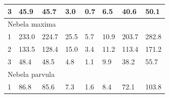 \documentclass[12pt, a4paper]{article}
\begin{document}
\begin{table}[h]
{\begin{tabular}{|llllllll|}
\multicolumn{1}{|l|}{3}                                         & \multicolumn{1}{l|}{45.9}                        & \multicolumn{1}{l|}{45.7}         & \multicolumn{1}{l|}{3.0}                         & \multicolumn{1}{l|}{0.7}                 & \multicolumn{1}{l|}{6.5}                      & \multicolumn{1}{l|}{40.6}         & 50.1                               \\ \hline
\multicolumn{8}{|l|}{Nebela maxima}                                                                                                                                                                                                                                                                                                                                           \\ \hline
\multicolumn{1}{|l|}{1}                                         & \multicolumn{1}{l|}{233.0}                       & \multicolumn{1}{l|}{224.7}        & \multicolumn{1}{l|}{25.5}                        & \multicolumn{1}{l|}{5.7}                 & \multicolumn{1}{l|}{10.9}                     & \multicolumn{1}{l|}{203.7}        & 282.8                              \\ \hline
\multicolumn{1}{|l|}{2}                                         & \multicolumn{1}{l|}{133.5}                       & \multicolumn{1}{l|}{128.4}        & \multicolumn{1}{l|}{15.0}                        & \multicolumn{1}{l|}{3.4}                 & \multicolumn{1}{l|}{11.2}                     & \multicolumn{1}{l|}{113.4}        & 171.2                              \\ \hline
\multicolumn{1}{|l|}{3}                                         & \multicolumn{1}{l|}{48.4}                        & \multicolumn{1}{l|}{48.5}         & \multicolumn{1}{l|}{4.8}                         & \multicolumn{1}{l|}{1.1}                 & \multicolumn{1}{l|}{9.9}                      & \multicolumn{1}{l|}{38.2}         & 55.7                               \\ \hline
\multicolumn{8}{|l|}{Nebela parvula}                                                                                                                                                                                                                                                                                                                                          \\ \hline
\multicolumn{1}{|l|}{1}                                         & \multicolumn{1}{l|}{86.8}                        & \multicolumn{1}{l|}{85.6}         & \multicolumn{1}{l|}{7.3}                         & \multicolumn{1}{l|}{1.6}                 & \multicolumn{1}{l|}{8.4}                      & \multicolumn{1}{l|}{72.1}         & 103.8                              \\ \hline

\end{tabular}}
\end{table}
\end{document}
